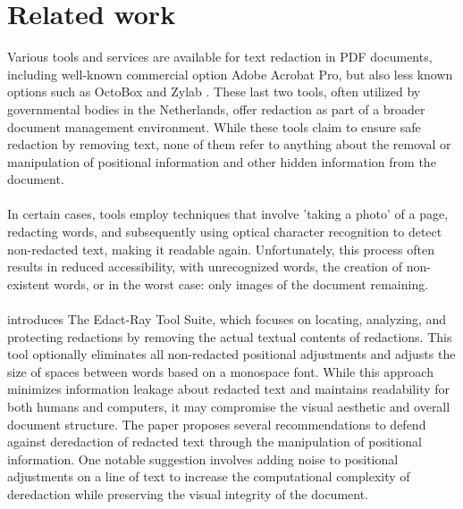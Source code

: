 \chapter{Related work}
Various tools and services are available for text redaction in PDF documents, including well-known commercial option Adobe Acrobat Pro, but also less known options such as OctoBox \cite{OCTOBOX} and Zylab \cite{Zylab}. These last two tools, often utilized by governmental bodies in the Netherlands, offer redaction as part of a broader document management environment. While these tools claim to ensure safe redaction by removing text, none of them refer to anything about the removal or manipulation of positional information and other hidden information from the document.
\\\\
In certain cases, tools employ techniques that involve 'taking a photo' of a page, redacting words, and subsequently using optical character recognition to detect non-redacted text, making it readable again. Unfortunately, this process often results in reduced accessibility, with unrecognized words, the creation of non-existent words, or in the worst case: only images of the document remaining.
\\\\
\cite{bland2022story} introduces The Edact-Ray Tool Suite, which focuses on locating, analyzing, and protecting redactions by removing the actual textual contents of redactions. This tool optionally eliminates all non-redacted positional adjustments and adjusts the size of spaces between words based on a monospace font. While this approach minimizes information leakage about redacted text and maintains readability for both humans and computers, it may compromise the visual aesthetic and overall document structure. The paper proposes several recommendations to defend against deredaction of redacted text through the manipulation of positional information. One notable suggestion involves adding noise to positional adjustments on a line of text to increase the computational complexity of deredaction while preserving the visual integrity of the document.
 

